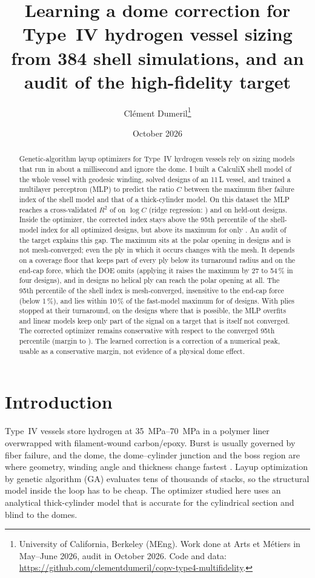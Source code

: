 \documentclass[11pt]{article}
\title{Learning a dome correction for Type~IV hydrogen vessel sizing from 384 shell simulations, and an audit of the high-fidelity target}
\author{Cl\'ement Dumeril\thanks{University of California, Berkeley (MEng). Work done at Arts et M\'etiers in May--June 2026, audit in October 2026. Code and data: \url{https://github.com/clementdumeril/copv-type4-multifidelity}.}}
\date{October 2026}
\begin{document}
\maketitle

\begin{abstract}
Genetic-algorithm layup optimizers for Type~IV hydrogen vessels rely on sizing models that run in about a millisecond and ignore the dome. I built a CalculiX shell model of the whole vessel with geodesic winding, solved \NdoeCases{} designs of an 11\,L vessel, and trained a multilayer perceptron (MLP) to predict the ratio $C$ between the maximum fiber failure index of the shell model and that of a thick-cylinder model. On this dataset the MLP reaches a cross-validated $R^2$ of \RtwoCvMlp{} on $\log C$ (ridge regression: \RtwoCvRidge{}) and \RtwoEvalMlp{} on \NevalCases{} held-out designs. Inside the optimizer, the corrected index stays above the 95th percentile of the shell-model index for all \NgaDesigns{} optimized designs, but above its maximum for only \NgaConsMax{}. An audit of the target explains this gap. The maximum sits at the polar opening in \NpeakAtPole{} designs and is not mesh-converged; even the ply in which it occurs changes with the mesh. It depends on a coverage floor that keeps part of every ply below its turnaround radius and on the end-cap force, which the DOE omits (applying it raises the maximum by 27 to 54\,\% in four designs), and in \NdoeInconsistent{} designs no helical ply can reach the polar opening at all. The 95th percentile of the shell index is mesh-converged, insensitive to the end-cap force (below 1\,\%), and lies within 10\,\% of the fast-model maximum for \NCninetyfiveWithinTen{} of \NdoeCases{} designs. With plies stopped at their turnaround, on the \NdoeConsistent{} designs where that is possible, the MLP overfits and linear models keep only part of the signal on a target that is itself not converged. The corrected optimizer remains conservative with respect to the converged 95th percentile (margin \GaMarginMin{} to \GaMarginMax{}). The learned correction is a correction of a numerical peak, usable as a conservative margin, not evidence of a physical dome effect.
\end{abstract}

\section{Introduction}

Type~IV vessels store hydrogen at \SIrange{35}{70}{MPa} in a polymer liner overwrapped with filament-wound carbon/epoxy. Burst is usually governed by fiber failure, and the dome, the dome--cylinder junction and the boss region are where geometry, winding angle and thickness change fastest \cite{Leh2015,Hu2021,Jois2021}. Layup optimization by genetic algorithm (GA) evaluates tens of thousands of stacks, so the structural model inside the loop has to be cheap. The optimizer studied here uses an analytical thick-cylinder model that is accurate for the cylindrical section and blind to the domes.
\end{document}
